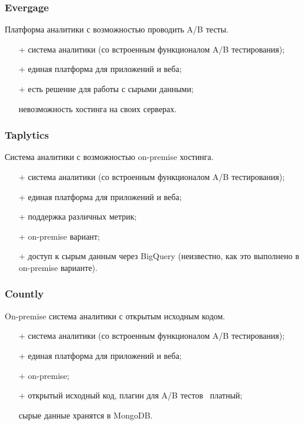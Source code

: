 \documentclass[../document.tex]{subfiles}
\begin{document}
    \subsubsection{Evergage}
    \par Платформа\cite{noauthor_evergage_nodate} аналитики с возможностью проводить A/B тесты.
    \begin{enumerate}
        \item[+] система аналитики (со встроенным функционалом A/B тестирования);
        \item[+] единая платформа для приложений и веба;
        \item[+] есть решение для работы с сырыми данными;
        \item[\textminus]  невозможность хостинга на своих серверах.
    \end{enumerate}
    \subsubsection{Taplytics}
    \par Система\cite{noauthor_taplytics_nodate} аналитики с возможностью on-premise хостинга.
    \begin{enumerate}
        \item[+] система аналитики (со встроенным функционалом A/B тестирования);
        \item[+] единая платформа для приложений и веба;
        \item[+]  поддержка различных метрик;
        \item[+] on-premise вариант;
        \item[+] доступ к сырым данным через BigQuery (неизвестно, как это выполнено в on-premise варианте).
    \end{enumerate}
    \subsubsection{Countly}
    \par On-premise система\cite{noauthor_countly_nodate} аналитики с открытым исходным кодом.
    \begin{enumerate}
        \item[+] система аналитики (со встроенным функционалом A/B тестирования);
        \item[+] единая платформа для приложений и веба; 
        \item[+] on-premise;
        \item[+] открытый исходный код, плагин для A/B тестов \textemdash\ платный;
        \item[\textminus] сырые данные хранятся в MongoDB.
    \end{enumerate}
\end{document}
